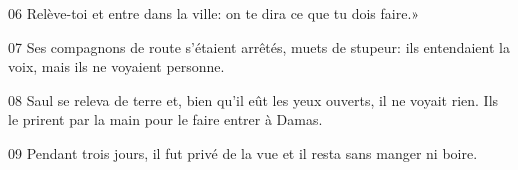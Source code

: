 
06 Relève-toi et entre dans la ville: on te dira ce que tu dois faire.»

07 Ses compagnons de route s’étaient arrêtés, muets de stupeur: ils entendaient la voix, mais ils ne voyaient personne.

08 Saul se releva de terre et, bien qu’il eût les yeux ouverts, il ne voyait rien. Ils le prirent par la main pour le faire entrer à Damas.

09 Pendant trois jours, il fut privé de la vue et il resta sans manger ni boire.

